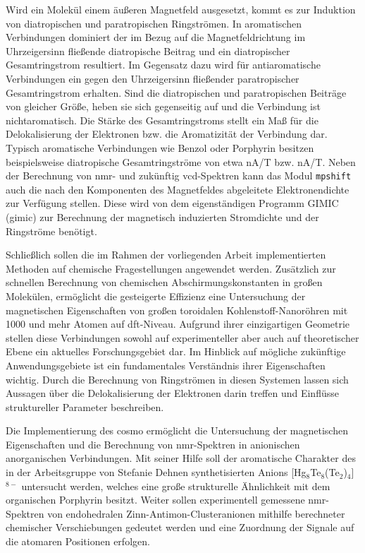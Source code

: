 \bigskip
Wird ein Molekül einem äußeren Magnetfeld ausgesetzt, kommt es zur Induktion von diatropischen und paratropischen Ringströmen.\supercite{taubert2011calculation} In aromatischen Verbindungen dominiert der im Bezug auf die Magnetfeldrichtung im Uhrzeigersinn fließende diatropische Beitrag und ein diatropischer Gesamtringstrom resultiert. Im Gegensatz dazu wird für antiaromatische Verbindungen ein gegen den Uhrzeigersinn fließender paratropischer Gesamtringstrom erhalten. Sind die diatropischen und paratropischen Beiträge von gleicher Größe, heben sie sich gegenseitig auf und die Verbindung ist nichtaromatisch. Die Stärke des Gesamtringstroms stellt ein Maß für die Delokalisierung der Elektronen bzw. die Aromatizität der Verbindung dar.\supercite{elvidge1961181,pople1966induced} Typisch aromatische Verbindungen wie Benzol oder Porphyrin besitzen beispielsweise diatropische Gesamtringströme von etwa \unit[12]{nA/T} bzw. \unit[27]{nA/T}.\supercite{fliegl2012aromatic} Neben der Berechnung von \ac{nmr}- und zukünftig \ac{vcd}-Spektren kann das Modul \texttt{mpshift} auch die nach den Komponenten des Magnetfeldes abgeleitete Elektronendichte zur Verfügung stellen. Diese wird von dem eigenständigen Programm GIMIC (\acl{gimic})\supercite{juselius2004calculation,taubert2011calculation,fliegl2011gauge,sundholm2016calculations} zur Berechnung der magnetisch induzierten Stromdichte und der Ringströme benötigt.

\bigskip
Schließlich sollen die im Rahmen der vorliegenden Arbeit implementierten Methoden auf chemische Fragestellungen angewendet werden. Zusätzlich zur schnellen Berechnung von chemischen Abschirmungskonstanten in großen Molekülen, ermöglicht die gesteigerte Effizienz eine Untersuchung der magnetischen Eigenschaften von großen toroidalen Kohlenstoff-Nanoröhren mit 1000 und mehr Atomen auf \ac{dft}-Niveau. Aufgrund ihrer einzigartigen Geometrie stellen diese Verbindungen sowohl auf experimenteller aber auch auf theoretischer Ebene ein aktuelles Forschungsgebiet dar. Im Hinblick auf mögliche zukünftige Anwendungsgebiete ist ein fundamentales Verständnis ihrer Eigenschaften wichtig. Durch die Berechnung von Ringströmen in diesen Systemen lassen sich Aussagen über die Delokalisierung der Elektronen darin treffen und Einflüsse struktureller Parameter beschreiben. 

Die Implementierung des \ac{cosmo} ermöglicht die Untersuchung der magnetischen Eigenschaften und die Berechnung von \ac{nmr}-Spektren in anionischen anorganischen Verbindungen. Mit seiner Hilfe soll der aromatische Charakter des in der Arbeitsgruppe von Stefanie Dehnen synthetisierten Anions [Hg$_8$Te$_8$(Te$_2$)$_4$]$^{8-}$ untersucht werden, welches eine große strukturelle Ähnlichkeit mit dem organischen Porphyrin besitzt. Weiter sollen experimentell gemessene \ac{nmr}-Spektren von endohedralen Zinn-Antimon-Clusteranionen mithilfe berechneter chemischer Verschiebungen gedeutet werden und eine Zuordnung der Signale auf die atomaren Positionen erfolgen. 

